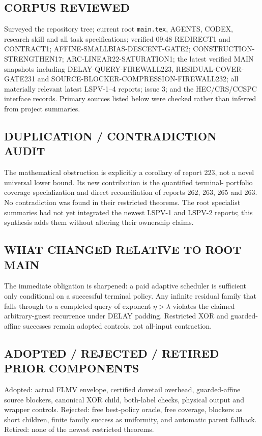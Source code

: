 \documentclass[11pt]{article}
\begin{document}
\subsection*{CORPUS REVIEWED}
Surveyed the repository tree; current root \texttt{main.tex}, AGENTS, CODEX,
research skill and all task specifications; verified 09:48 REDIRECT1 and
CONTRACT1; AFFINE-SMALLBIAS-DESCENT-GATE2; CONSTRUCTION-STRENGTHEN17;
ARC-LINEAR22-SATURATION1; the latest verified MAIN snapshots including
DELAY-QUERY-FIREWALL223, RESIDUAL-COVER-GATE231 and
SOURCE-BLOCKER-COMPRESSION-FIREWALL232; all materially relevant latest
LSPV-1--4 reports; issue 3; and the HEC/CRS/CCSPC interface records.  Primary
sources listed below were checked rather than inferred from project summaries.

\subsection*{DUPLICATION / CONTRADICTION AUDIT}
The mathematical obstruction is explicitly a corollary of report 223, not a
novel universal lower bound.  Its new contribution is the quantified terminal-
portfolio coverage specialization and direct reconciliation of reports 262,
263, 265 and 263.  No contradiction was found in their restricted theorems.
The root specialist summaries had not yet integrated the newest LSPV-1 and
LSPV-2 reports; this synthesis adds them without altering their ownership claims.

\subsection*{WHAT CHANGED RELATIVE TO ROOT MAIN}
The immediate obligation is sharpened: a paid adaptive scheduler is sufficient
only conditional on a successful terminal policy.  Any infinite residual family
that falls through to a completed query of exponent $\eta>\lambda$ violates the
claimed arbitrary-guest recurrence under DELAY padding.  Restricted XOR and
guarded-affine successes remain adopted controls, not all-input contraction.

\subsection*{ADOPTED / REJECTED / RETIRED PRIOR COMPONENTS}
Adopted: actual FLMV envelope, certified dovetail overhead, guarded-affine source
blockers, canonical XOR child, both-label checks, physical output and wrapper
controls.  Rejected: free best-policy oracle, free coverage, blockers as short
children, finite family success as uniformity, and automatic parent fallback.
Retired: none of the newest restricted theorems.
\end{document}
